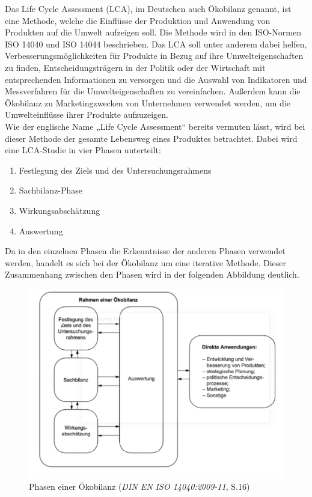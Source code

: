 Das Life Cycle Assessment (LCA), im Deutschen auch Ökobilanz genannt, ist eine Methode, welche die Einflüsse der Produktion und Anwendung von Produkten auf die Umwelt aufzeigen soll. Die Methode wird in den ISO-Normen ISO 14040 und ISO 14044 beschrieben. Das LCA soll unter anderem dabei helfen, Verbesserungsmöglichkeiten für Produkte in Bezug auf ihre Umwelteigenschaften zu finden, Entscheidungsträgern in der Politik oder der Wirtschaft mit entsprechenden Informationen zu versorgen und die Auswahl von Indikatoren und Messverfahren für die Umwelteigenschaften zu vereinfachen. Außerdem kann die Ökobilanz zu Marketingzwecken von Unternehmen verwendet werden, um die Umwelteinflüsse ihrer Produkte aufzuzeigen.\\
Wie der englische Name „Life Cycle Assessment“ bereits vermuten lässt, wird bei dieser Methode der gesamte Lebensweg eines Produktes betrachtet. Dabei wird eine LCA-Studie in vier Phasen unterteilt:
\begin{enumerate}
    \item Festlegung des Ziels und des Untersuchungsrahmens
    \item Sachbilanz-Phase
    \item Wirkungsabschätzung
    \item Auswertung
\end{enumerate}
Da in den einzelnen Phasen die Erkenntnisse der anderen Phasen verwendet werden, handelt es sich bei der Ökobilanz um eine iterative Methode. Dieser Zusammenhang zwischen den Phasen wird in der folgenden Abbildung deutlich.
\FloatBarrier
\begin{figure}[ht!]
    \centering
    \includegraphics[width=.75\textwidth]{quellen/oekobilanz.png}
    \caption[Phasen einer Ökobilanz]{Phasen einer Ökobilanz (\textit{DIN EN ISO 14040:2009-11}, S.16)}
\end{figure}
\FloatBarrier